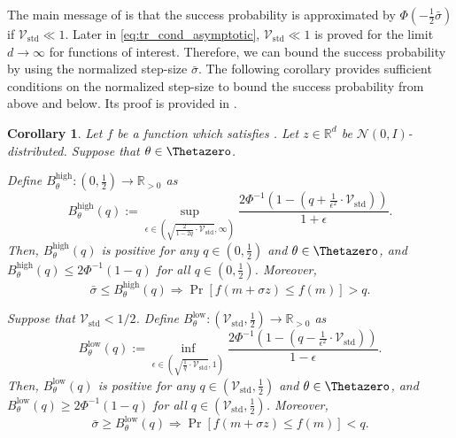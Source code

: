 \documentclass[journal]{IEEEtran}
\DeclareMathOperator{\Var}{Var}   %
\providecommand{\R}{\mathbb{R}} %
\providecommand{\E}{\mathbb{E}} %
\renewcommand{\geq}{\geqslant} %
\renewcommand{\leq}{\leqslant} %
\newtheorem{corollary}[theorem]{Corollary}
\theoremstyle{definition}
\begin{document}
The main message of  is that the success probability is approximated by $ \Phi\left( - \frac12 \bar\sigma\right)$ if $\mathcal{V}_\mathrm{std} \ll 1$.
Later in \eqref{eq:tr_cond_asymptotic}, $\mathcal{V}_\mathrm{std} \ll 1$ is proved for the limit $d \to \infty$ for functions of interest.
Therefore, we can bound the success probability by using the normalized step-size $\bar\sigma$. 
The following corollary provides sufficient conditions on the normalized step-size to bound the success probability from above and below.
Its proof is provided in .
\begin{corollary}%
\label{cor:successprobability}
Let $f$ be a function which satisfies .
Let $z \in \R^d$ be $\mathcal{N}(0, I)$-distributed.
Suppose that $\theta \in \Thetazero$.

Define $B_\theta^\mathrm{high} : \left(0, \frac12\right) \to \R_{> 0}$ as
\begin{equation}
B_\theta^\mathrm{high}(q) := \sup_{
{\epsilon\in\left(\sqrt{ \frac{ 2 }{1 - 2q} \cdot \mathcal{V}_\mathrm{std} }, \infty\right)}
}
\frac{ 2 \Phi^{-1} \left(1 - \left(q + \frac{1}{\epsilon^2} \cdot \mathcal{V}_\mathrm{std}\right) \right)}{ 1 + \epsilon} .
\label{eq:cor:b_high}
\end{equation}
Then, 
$B_\theta^\mathrm{high}(q)$ is positive for any $q\in(0, \frac12)$ and $\theta\in\Thetazero$, 
and $B_\theta^\mathrm{high}(q) \leq 2 \Phi^{-1}(1-q)$ for all $q \in \left(0, \frac12\right)$.
Moreover, 
\begin{equation}
\bar\sigma
\leq B_\theta^\mathrm{high}(q)
\Rightarrow
\Pr\left[f(m + \sigma z) \leq f(m) \right] > q
.
\label{eq:cor:successprobability:large}
\end{equation}

Suppose that $\mathcal{V}_\mathrm{std}<1/2$.%
Define $B_\theta^\mathrm{low}: \left( \mathcal{V}_\mathrm{std} , \frac{1}{2}\right) \to \R_{> 0}$ as
\begin{equation}
B_\theta^\mathrm{low}(q) := \inf_{
{\epsilon\in\left(\sqrt{ \frac{ 1 }{q} \cdot \mathcal{V}_\mathrm{std} }, 1\right)}
}
\frac{ 2 \Phi^{-1} \left(1 - \left(q - \frac{1}{\epsilon^2} \cdot \mathcal{V}_\mathrm{std}\right) \right)}{ 1 - \epsilon} .
\label{eq:cor:b_low}
\end{equation}
Then,
$B_\theta^\mathrm{low}(q)$ is positive for any $q\in\left( \mathcal{V}_\mathrm{std} , \frac{1}{2}\right)$ and $\theta\in\Thetazero$,
and $B_\theta^\mathrm{low}(q) \geq 2 \Phi^{-1}(1-q)$ for all $q \in \left( \mathcal{V}_\mathrm{std} , \frac{1}{2}\right)$.
Moreover,
\begin{equation}
\bar\sigma
\geq B_\theta^\mathrm{low}(q)
\Rightarrow
\Pr\left[f(m + \sigma z) \leq f(m) \right] < q
.
\label{eq:cor:successprobability:small}
\end{equation}
\end{corollary}
\end{document}
